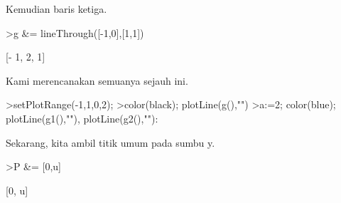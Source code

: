\documentclass[12pt,Times new roman,letterpaper]{book}
\begin{document}
\begin{eulernootebook}
\begin{eulercomment}
\begin{eulercomment}
\begin{eulernootebook}
\begin{eulercomment}
\begin{eulercomment}
\begin{eulercomment}
\begin{eulercomment}
\begin{eulercomment}
\begin{eulercomment}
\begin{eulernotebook}
\begin{eulercomment}
\begin{eulercomment}
\begin{eulercomment}
\begin{eulercomment}
\begin{eulercomment}
\begin{euleroutput}
\end{euleroutput}
\begin{eulercomment}
Kemudian baris ketiga.
\end{eulercomment}
\begin{eulerprompt}
>g &= lineThrough([-1,0],[1,1])
\end{eulerprompt}
\begin{euleroutput}
  
                               [- 1, 2, 1]
  
\end{euleroutput}
\begin{eulercomment}
Kami merencanakan semuanya sejauh ini.
\end{eulercomment}
\begin{eulerprompt}
>setPlotRange(-1,1,0,2);
>color(black); plotLine(g(),"")
>a:=2; color(blue); plotLine(g1(),""), plotLine(g2(),""):
\end{eulerprompt}
\begin{eulercomment}
Sekarang, kita ambil titik umum pada sumbu y.
\end{eulercomment}
\begin{eulerprompt}
>P &= [0,u]
\end{eulerprompt}
\begin{euleroutput}
  
                                  [0, u]
  

\end{euleroutput}
\end{eulercomment}
\end{eulercomment}
\end{eulercomment}
\end{eulercomment}
\end{eulercomment}
\end{eulernotebook}
\end{eulercomment}
\end{eulercomment}
\end{eulercomment}
\end{eulercomment}
\end{eulercomment}
\end{eulercomment}
\end{eulernootebook}
\end{eulercomment}
\end{eulercomment}
\end{eulernootebook}
\end{document}
